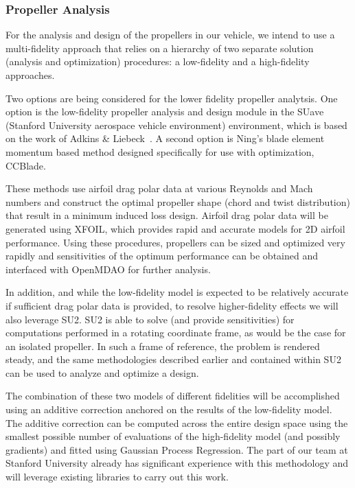 \documentclass[]{aiaa-tc}
\begin{document}
    \subsubsection{Propeller Analysis}
    
    For the analysis and design of the propellers in our vehicle, we intend to use a multi-fidelity approach that relies on a hierarchy of two separate solution (analysis and optimization) procedures: a low-fidelity and a high-fidelity approaches.
    
    Two options are being considered for the lower fidelity propeller analytsis. One option is the low-fidelity propeller analysis and design module in the SUave (Stanford University aerospace vehicle environment) environment, which is based on the work of Adkins \& Liebeck~\cite{Adkins:Design}.  A second option is Ning's blade element momentum based method designed specifically for use with optimization, 
    CCBlade\cite{NING:BEM}. 

    These methods use airfoil drag polar data at various Reynolds and Mach numbers and construct the optimal propeller shape (chord and twist distribution) that result in a minimum induced loss design. Airfoil drag polar data will be generated using XFOIL, which provides rapid and accurate models for 2D airfoil performance. 
    Using these procedures, propellers can be sized and optimized very rapidly and sensitivities of the optimum performance can be obtained and interfaced with OpenMDAO for further analysis.
    
    In addition, and while the low-fidelity model is expected to be relatively accurate if sufficient drag polar data is provided, to resolve higher-fidelity effects we will also leverage SU2.  SU2 is able to solve (and provide sensitivities) for computations performed in a rotating coordinate frame, as would be the case for an isolated propeller.  In such a frame of reference, the problem is rendered steady, and the same methodologies described earlier and contained within SU2 can be used to analyze and optimize a design.

    The combination of these two models of different fidelities will be accomplished using an additive correction anchored on the results of the low-fidelity model.  The additive correction can be computed across the entire design space using the smallest possible number of evaluations of the high-fidelity model (and possibly gradients) and fitted using Gaussian Process Regression.  The part of our team at Stanford University already has significant experience with this methodology and will leverage existing libraries to carry out this work.
\end{document}
